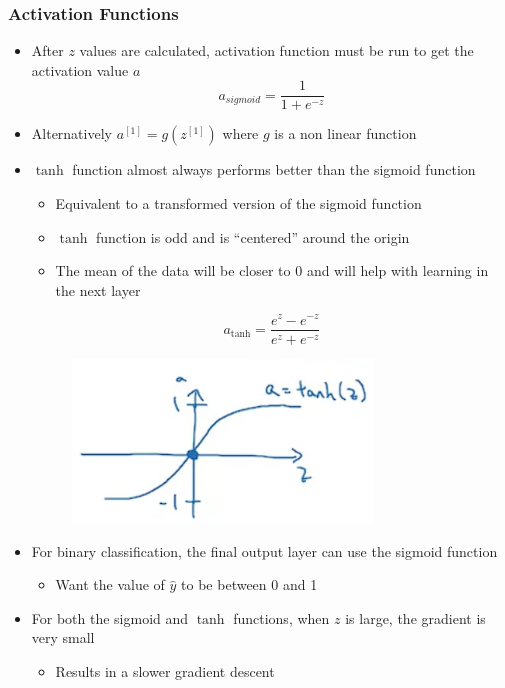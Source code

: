 \documentclass[12pt, letterpaper]{article}
\begin{document}
    \subsubsection{Activation Functions}
    \begin{itemize}
        \item After $z$ values are calculated, activation function must be run to get the activation value $a$
        $$a_{sigmoid}=\frac{1}{1+e^{-z}}$$
        \item Alternatively $a^{[1]}=g(z^{[1]})$ where $g$ is a non linear function
        \item $\tanh$ function almost always performs better than the sigmoid function
        \begin{itemize}
            \item Equivalent to a transformed version of the sigmoid function  
            \item $\tanh$ function is odd and is ``centered'' around the origin
            \item The mean of the data will be closer to 0 and will help with learning in the next layer
        \end{itemize}
        $$a_{\tanh}=\frac{e^z-e^{-z}}{e^z+e^{-z}}$$
        \begin{figure}[ht]
            \centering
            \includegraphics[width=8cm]{8.png}
        \end{figure}
        \item For binary classification, the final output layer can use the sigmoid function
        \begin{itemize}
            \item Want the value of $\hat{y}$ to be between 0 and 1
        \end{itemize}
        \item For both the sigmoid and $\tanh$ functions, when $z$ is large, the gradient is very small
        \begin{itemize}
            \item Results in a slower gradient descent
        \end{itemize}

\end{itemize}
\end{document}
